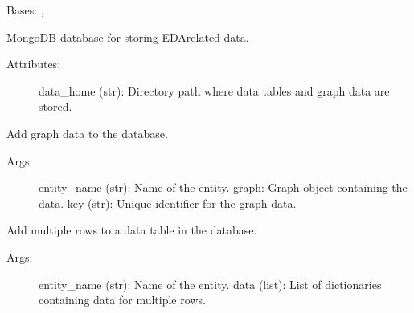 \documentclass[letterpaper,10pt,english]{sphinxmanual}
\begin{document}

\begin{fulllineitems}
\label{\detokenize{eda_schema:eda_schema.db.MongoDB}}
\pysigstartsignatures
{}
\pysigstopsignatures
\sphinxAtStartPar
Bases: {\hyperref[\detokenize{eda_schema:eda_schema.db.BaseDB}]{}}, 

\sphinxAtStartPar
MongoDB database for storing EDA\sphinxhyphen{}related data.
\begin{description}
\item[{Attributes:}] \leavevmode
\sphinxAtStartPar
data\_home (str): Directory path where data tables and graph data are stored.

\end{description}

\begin{fulllineitems}
\label{\detokenize{eda_schema:eda_schema.db.MongoDB.add_graph_data}}
\pysigstartsignatures
{}
\pysigstopsignatures
\sphinxAtStartPar
Add graph data to the database.
\begin{description}
\item[{Args:}] \leavevmode
\sphinxAtStartPar
entity\_name (str): Name of the entity.
graph: Graph object containing the data.
key (str): Unique identifier for the graph data.

\end{description}

\end{fulllineitems}


\begin{fulllineitems}
\label{\detokenize{eda_schema:eda_schema.db.MongoDB.add_table_data}}
\pysigstartsignatures
{}
\pysigstopsignatures
\sphinxAtStartPar
Add multiple rows to a data table in the database.
\begin{description}
\item[{Args:}] \leavevmode
\sphinxAtStartPar
entity\_name (str): Name of the entity.
data (list): List of dictionaries containing data for multiple rows.


\end{description}
\end{fulllineitems}
\end{fulllineitems}
\end{document}
